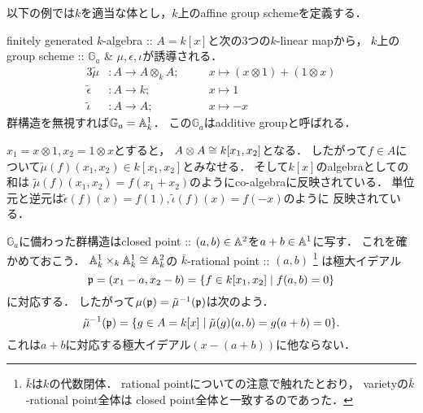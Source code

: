 \documentclass[a4paper]{jsarticle}
\newcommand{\Ga}{\mathbb{G}_a}
\begin{document}
    以下の例では$k$を適当な体とし，$k$上のaffine group schemeを定義する．
    \begin{Example}[$\Ga$]
        finitely generated $k$-algebra :: $A=k[x]$と次の3つの$k$-linear mapから，
        $k$上のgroup scheme :: $\Ga$ \& $\mu,\epsilon,\iota$が誘導される．
        \begin{alignat*}{3}
            \tilde{\mu}&:
                A \to A \otimes_k A; &&
                \quad x \mapsto (x \otimes 1)+(1 \otimes x) \\
            \tilde{\epsilon}&:
                A \to k; &&
                \quad x \mapsto 1 \\
            \tilde{\iota}&:
                A \to A; &&
                \quad x \mapsto -x
        \end{alignat*}
        群構造を無視すれば$\Ga=\affine^1_k$．
        この$\Ga$はadditive groupと呼ばれる．

        $x_1=x \otimes 1, x_2=1 \otimes x$とすると，
        $A \otimes A \cong k[x_1,x_2]$となる．
        したがって$f \in A$について$\tilde{\mu}(f)(x_1,x_2) \in k[x_1,x_2]$とみなせる．
        そして$k[x]$のalgebraとしての和は
        $\tilde{\mu}(f)(x_1,x_2)=f(x_1+x_2)$のようにco-algebraに反映されている．
        単位元と逆元は$\tilde{\epsilon}(f)(x)=f(1), \tilde{\iota}(f)(x)=f(-x)$のように
        反映されている．
    
        $\Ga$に備わった群構造はclosed point :: $(a,b) \in \mathbb{A}^2$を$a+b \in \mathbb{A}^1$に写す．
        これを確かめておこう．
        $\mathbb{A}^1_k \times_k \mathbb{A}^1_k \cong \mathbb{A}^2_k$の
        $\bar{k}$-rational point :: $(a,b)$
        \footnote
        {
            $\bar{k}$は$k$の代数閉体．
            rational pointについての注意で触れたとおり，
            varietyの$\bar{k}$-rational point全体は
            closed point全体と一致するのであった．
        }
        は極大イデアル
        \[ \mathfrak{p}=(x_1-a, x_2-b)=\{ f \in k[x_1,x_2] \mid f(a,b)=0 \} \]に対応する．
        したがって$\mu(\mathfrak{p})=\tilde{\mu}^{-1}(\mathfrak{p})$は次のよう．
        \[ \tilde{\mu}^{-1}(\mathfrak{p})=\{ g \in A=k[x] \mid \tilde{\mu}(g)(a,b)=g(a+b)=0 \}. \]
        これは$a+b$に対応する極大イデアル$(x-(a+b))$に他ならない．
    \end{Example}
\end{document}
